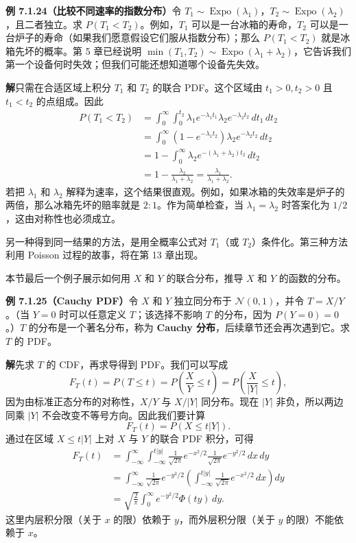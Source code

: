 \documentclass[UTF8,12pt,a4paper,fontset=fandol]{ctexart}
\begin{document}
\noindent\textbf{例 7.1.24（比较不同速率的指数分布）}\quad 令 $T_1\sim \operatorname{Expo}(\lambda_1)$，$T_2\sim \operatorname{Expo}(\lambda_2)$，且二者独立。求 $P(T_1<T_2)$。例如，$T_1$ 可以是一台冰箱的寿命，$T_2$ 可以是一台炉子的寿命（如果我们愿意假设它们服从指数分布）；那么 $P(T_1<T_2)$ 就是冰箱先坏的概率。第 5 章已经说明 $\min(T_1,T_2)\sim \operatorname{Expo}(\lambda_1+\lambda_2)$，它告诉我们第一个设备何时失效；但我们可能还想知道哪个设备先失效。

\noindent\textbf{解}\quad 只需在合适区域上积分 $T_1$ 和 $T_2$ 的联合 PDF。这个区域由 $t_1>0,t_2>0$ 且 $t_1<t_2$ 的点组成。因此
\[
\begin{aligned}
  P(T_1<T_2)
  &=\int_0^\infty\int_0^{t_2}\lambda_1 e^{-\lambda_1 t_1}\lambda_2 e^{-\lambda_2 t_2}\,dt_1\,dt_2\\
  &=\int_0^\infty (1-e^{-\lambda_1 t_2})\lambda_2 e^{-\lambda_2 t_2}\,dt_2\\
  &=1-\int_0^\infty \lambda_2 e^{-(\lambda_1+\lambda_2)t_2}\,dt_2\\
  &=1-\frac{\lambda_2}{\lambda_1+\lambda_2}
  =\frac{\lambda_1}{\lambda_1+\lambda_2}.
\end{aligned}
\]
若把 $\lambda_1$ 和 $\lambda_2$ 解释为速率，这个结果很直观。例如，如果冰箱的失效率是炉子的两倍，那么冰箱先坏的赔率就是 $2:1$。作为简单检查，当 $\lambda_1=\lambda_2$ 时答案化为 $1/2$，这由对称性也必须成立。

另一种得到同一结果的方法，是用全概率公式对 $T_1$（或 $T_2$）条件化。第三种方法利用 Poisson 过程的故事，将在第 13 章出现。

本节最后一个例子展示如何用 $X$ 和 $Y$ 的联合分布，推导 $X$ 和 $Y$ 的函数的分布。

\noindent\textbf{例 7.1.25（Cauchy PDF）}\quad 令 $X$ 和 $Y$ 独立同分布于 $\mathcal{N}(0,1)$，并令 $T=X/Y$。（当 $Y=0$ 时可以任意定义 $T$；该选择不影响 $T$ 的分布，因为 $P(Y=0)=0$。）$T$ 的分布是一个著名分布，称为 \textbf{Cauchy 分布}，后续章节还会再次遇到它。求 $T$ 的 PDF。

\noindent\textbf{解}\quad 先求 $T$ 的 CDF，再求导得到 PDF。我们可以写成
\[
  F_T(t)=P(T\le t)=P\left(\frac{X}{Y}\le t\right)
  =P\left(\frac{X}{|Y|}\le t\right),
\]
因为由标准正态分布的对称性，$X/Y$ 与 $X/|Y|$ 同分布。现在 $|Y|$ 非负，所以两边同乘 $|Y|$ 不会改变不等号方向。因此我们要计算
\[
  F_T(t)=P(X\le t|Y|).
\]
通过在区域 $X\le t|Y|$ 上对 $X$ 与 $Y$ 的联合 PDF 积分，可得
\[
\begin{aligned}
  F_T(t)
  &=\int_{-\infty}^{\infty}\int_{-\infty}^{t|y|}
    \frac{1}{\sqrt{2\pi}}e^{-x^2/2}\frac{1}{\sqrt{2\pi}}e^{-y^2/2}\,dx\,dy\\
  &=\int_{-\infty}^{\infty}\frac{1}{\sqrt{2\pi}}e^{-y^2/2}
    \left(\int_{-\infty}^{t|y|}\frac{1}{\sqrt{2\pi}}e^{-x^2/2}\,dx\right)dy\\
  &=\sqrt{\frac{2}{\pi}}\int_0^\infty e^{-y^2/2}\Phi(ty)\,dy.
\end{aligned}
\]
这里内层积分限（关于 $x$ 的限）依赖于 $y$，而外层积分限（关于 $y$ 的限）不能依赖于 $x$。
\end{document}

